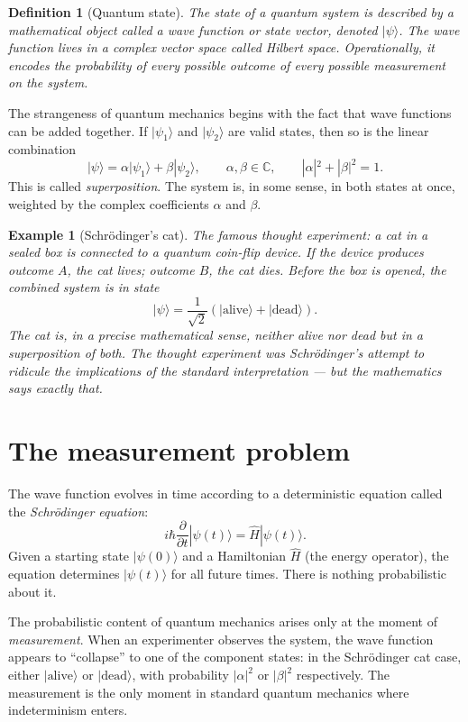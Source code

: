 \documentclass[11pt,a4paper]{book}
\theoremstyle{cleanrm}
\newtheorem{definition}{Definition}[chapter]
\newtheorem{example}{Example}[chapter]
\begin{document}
\begin{definition}[Quantum state]
The state of a quantum system is described by a mathematical object
called a \emph{wave function} or \emph{state vector}, denoted $|\psi\rangle$.
The wave function lives in a complex vector space called Hilbert space.
Operationally, it encodes the probability of every possible outcome of
every possible measurement on the system.
\end{definition}

The strangeness of quantum mechanics begins with the fact that wave
functions can be added together. If $|\psi_1\rangle$ and $|\psi_2\rangle$
are valid states, then so is the linear combination
\[
    |\psi\rangle = \alpha |\psi_1\rangle + \beta |\psi_2\rangle, \qquad
    \alpha, \beta \in \mathbb{C}, \qquad |\alpha|^2 + |\beta|^2 = 1.
\]
This is called \emph{superposition}. The system is, in some sense, in
both states at once, weighted by the complex coefficients $\alpha$ and
$\beta$.

\begin{example}[Schr\"odinger's cat]
The famous thought experiment: a cat in a sealed box is connected to a
quantum coin-flip device. If the device produces outcome $A$, the cat
lives; outcome $B$, the cat dies. Before the box is opened, the
combined system is in state
\[
    |\psi\rangle = \frac{1}{\sqrt{2}} \left( |\text{alive}\rangle +
    |\text{dead}\rangle \right).
\]
The cat is, in a precise mathematical sense, neither alive nor dead but
in a superposition of both. The thought experiment was Schr\"odinger's
attempt to ridicule the implications of the standard interpretation
--- but the mathematics says exactly that.
\end{example}

\section{The measurement problem}

The wave function evolves in time according to a deterministic equation
called the \emph{Schr\"odinger equation}:
\[
    i\hbar \frac{\partial}{\partial t} |\psi(t)\rangle = \hat{H} |\psi(t)\rangle.
\]
Given a starting state $|\psi(0)\rangle$ and a Hamiltonian $\hat{H}$
(the energy operator), the equation determines $|\psi(t)\rangle$ for
all future times. There is nothing probabilistic about it.

The probabilistic content of quantum mechanics arises only at the
moment of \emph{measurement}. When an experimenter observes the
system, the wave function appears to ``collapse'' to one of the
component states: in the Schr\"odinger cat case, either
$|\text{alive}\rangle$ or $|\text{dead}\rangle$, with probability
$|\alpha|^2$ or $|\beta|^2$ respectively. The measurement is the only
moment in standard quantum mechanics where indeterminism enters.
\end{document}
